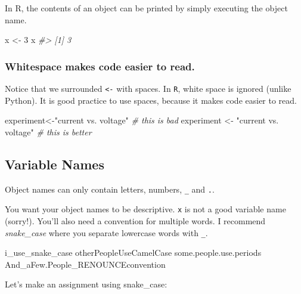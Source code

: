 \documentclass[]{book}
\newenvironment{Shaded}{\begin{snugshade}}{\end{snugshade}}
\newcommand{\DecValTok}[1]{\textcolor[rgb]{0.00,0.00,0.81}{#1}}
\newcommand{\StringTok}[1]{\textcolor[rgb]{0.31,0.60,0.02}{#1}}
\newcommand{\CommentTok}[1]{\textcolor[rgb]{0.56,0.35,0.01}{\textit{#1}}}
\newcommand{\NormalTok}[1]{#1}
\begin{document}
In R, the contents of an object can be printed by simply executing the
object name.

\begin{Shaded}
\begin{Highlighting}[]
\NormalTok{x <-}\StringTok{ }\DecValTok{3}
\NormalTok{x}
\CommentTok{#> [1] 3}
\end{Highlighting}
\end{Shaded}

\subsubsection*{Whitespace makes code easier to
read.}\label{whitespace-makes-code-easier-to-read.}

Notice that we surrounded \texttt{\textless{}-} with spaces. In
\texttt{R}, white space is ignored (unlike Python). It is good practice
to use spaces, because it makes code easier to read.

\begin{Shaded}
\begin{Highlighting}[]
\NormalTok{experiment<-}\StringTok{"current vs. voltage"}   \CommentTok{# this is bad}
\NormalTok{experiment <-}\StringTok{ "current vs. voltage"} \CommentTok{# this is better}
\end{Highlighting}
\end{Shaded}

\subsection{Variable Names}\label{variable-names}

Object names can only contain letters, numbers, \texttt{\_} and
\texttt{.}.

You want your object names to be descriptive. \texttt{x} is not a good
variable name (sorry!). You'll also need a convention for multiple
words. I recommend \emph{snake\_case} where you separate lowercase words
with \texttt{\_}.

\begin{Shaded}
\begin{Highlighting}[]
\NormalTok{i_use_snake_case}
\NormalTok{otherPeopleUseCamelCase}
\NormalTok{some.people.use.periods}
\NormalTok{And_aFew.People_RENOUNCEconvention}
\end{Highlighting}
\end{Shaded}

Let's make an assignment using snake\_case:
\end{document}
